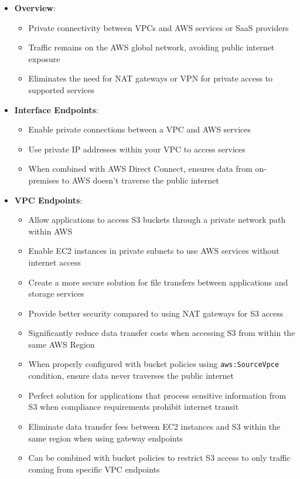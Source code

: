 \documentclass[11pt,a4paper]{report}
\begin{document}
\begin{itemize}
  \item \textbf{Overview}:
\begin{itemize}
  \item Private connectivity between VPCs and AWS services or SaaS providers
  \item Traffic remains on the AWS global network, avoiding public internet exposure
  \item Eliminates the need for NAT gateways or VPN for private access to supported services
\end{itemize}
  \item \textbf{Interface Endpoints}:
\begin{itemize}
  \item Enable private connections between a VPC and AWS services
  \item Use private IP addresses within your VPC to access services
  \item When combined with AWS Direct Connect, ensures data from on-premises to AWS doesn't traverse the public internet
\end{itemize}
  \item \textbf{VPC Endpoints}:
\begin{itemize}
  \item Allow applications to access S3 buckets through a private network path within AWS
  \item Enable EC2 instances in private subnets to use AWS services without internet access
  \item Create a more secure solution for file transfers between applications and storage services
  \item Provide better security compared to using NAT gateways for S3 access
  \item Significantly reduce data transfer costs when accessing S3 from within the same AWS Region
  \item When properly configured with bucket policies using \texttt{aws:SourceVpce} condition, ensure data never traverses the public internet
  \item Perfect solution for applications that process sensitive information from S3 when compliance requirements prohibit internet transit
  \item Eliminate data transfer fees between EC2 instances and S3 within the same region when using gateway endpoints
  \item Can be combined with bucket policies to restrict S3 access to only traffic coming from specific VPC endpoints

\end{itemize}
\end{itemize}
\end{document}
